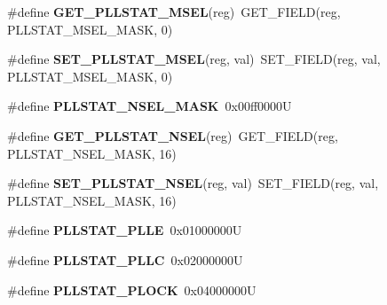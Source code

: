 \begin{DoxyCompactItemize}
\mbox{\label{group__lpc24xx__regs_ga1f35b0f9a9b609579451c1215e238829}} 
\#define {\bfseries G\+E\+T\+\_\+\+P\+L\+L\+S\+T\+A\+T\+\_\+\+M\+S\+EL}(reg)~G\+E\+T\+\_\+\+F\+I\+E\+LD(reg, P\+L\+L\+S\+T\+A\+T\+\_\+\+M\+S\+E\+L\+\_\+\+M\+A\+SK, 0)
\item 
\mbox{\label{group__lpc24xx__regs_gacd30b9389c4f33f289c8b184e7e3d346}} 
\#define {\bfseries S\+E\+T\+\_\+\+P\+L\+L\+S\+T\+A\+T\+\_\+\+M\+S\+EL}(reg,  val)~S\+E\+T\+\_\+\+F\+I\+E\+LD(reg, val, P\+L\+L\+S\+T\+A\+T\+\_\+\+M\+S\+E\+L\+\_\+\+M\+A\+SK, 0)
\item 
\mbox{\label{group__lpc24xx__regs_gaa346d325eccbb512b2eea82d51ac0168}} 
\#define {\bfseries P\+L\+L\+S\+T\+A\+T\+\_\+\+N\+S\+E\+L\+\_\+\+M\+A\+SK}~0x00ff0000U
\item 
\mbox{\label{group__lpc24xx__regs_gadc6a5b7664692ac5deae96c8bd8e372b}} 
\#define {\bfseries G\+E\+T\+\_\+\+P\+L\+L\+S\+T\+A\+T\+\_\+\+N\+S\+EL}(reg)~G\+E\+T\+\_\+\+F\+I\+E\+LD(reg, P\+L\+L\+S\+T\+A\+T\+\_\+\+N\+S\+E\+L\+\_\+\+M\+A\+SK, 16)
\item 
\mbox{\label{group__lpc24xx__regs_gaf1cba74a60cb03ec4845eeac4c8032fc}} 
\#define {\bfseries S\+E\+T\+\_\+\+P\+L\+L\+S\+T\+A\+T\+\_\+\+N\+S\+EL}(reg,  val)~S\+E\+T\+\_\+\+F\+I\+E\+LD(reg, val, P\+L\+L\+S\+T\+A\+T\+\_\+\+N\+S\+E\+L\+\_\+\+M\+A\+SK, 16)
\item 
\mbox{\label{group__lpc24xx__regs_ga412da0186485dff174e531b8548225ad}} 
\#define {\bfseries P\+L\+L\+S\+T\+A\+T\+\_\+\+P\+L\+LE}~0x01000000U
\item 
\mbox{\label{group__lpc24xx__regs_gab41a4b273d481383c6cb0668779cd99f}} 
\#define {\bfseries P\+L\+L\+S\+T\+A\+T\+\_\+\+P\+L\+LC}~0x02000000U
\item 
\mbox{\label{group__lpc24xx__regs_ga3ff6f7870598567e2424773fd143831c}} 
\#define {\bfseries P\+L\+L\+S\+T\+A\+T\+\_\+\+P\+L\+O\+CK}~0x04000000U
\item 
\mbox{\label{group__lpc24xx__regs_ga0b0726eae1e1fd9fa877b7bf11d0e4f8}} 

\end{DoxyCompactItemize}
